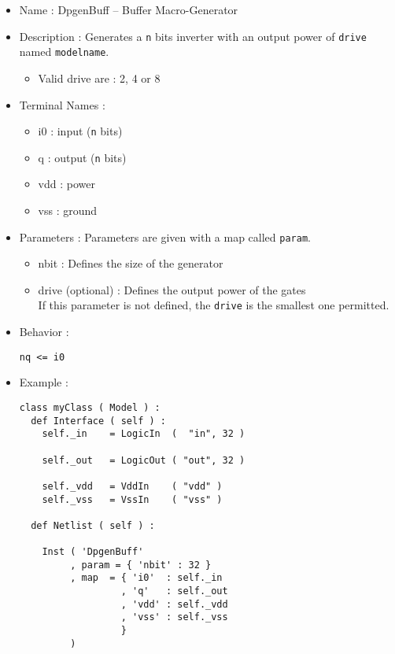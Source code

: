 \begin{itemize}
    \item Name : DpgenBuff -- Buffer Macro-Generator
    \item Description : Generates a \verb-n- bits inverter with an output power of \verb-drive- named \verb-modelname-.
    \begin{itemize}
        \item Valid drive are : 2, 4 or 8
    \end{itemize}
    \item Terminal Names :
    \begin{itemize}
        \item i0 : input (\verb-n- bits)
        \item q : output (\verb-n- bits)
        \item vdd : power
        \item vss : ground
    \end{itemize}
    \item Parameters : Parameters are given with a map called \verb-param-.
    \begin{itemize}
        \item nbit : Defines the size of the generator
        \item drive (optional) : Defines the output power of the gates\\If this parameter is not defined, the \verb-drive- is the smallest one permitted.
    \end{itemize}
    \item Behavior :
\begin{verbatim}
nq <= i0
\end{verbatim}
    \item Example :
\begin{verbatim}
class myClass ( Model ) :
  def Interface ( self ) :
    self._in    = LogicIn  (  "in", 32 )
    
    self._out   = LogicOut ( "out", 32 )

    self._vdd   = VddIn    ( "vdd" )
    self._vss   = VssIn    ( "vss" )
    
  def Netlist ( self ) :
      
    Inst ( 'DpgenBuff'
         , param = { 'nbit' : 32 }
         , map  = { 'i0'  : self._in
                  , 'q'   : self._out
                  , 'vdd' : self._vdd
                  , 'vss' : self._vss
                  }
         )
\end{verbatim}
\end{itemize}
